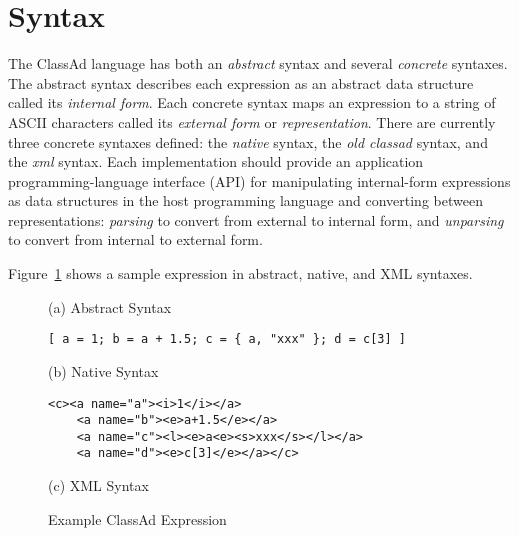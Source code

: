 \documentclass{article}
\begin{document}
\section{Syntax}

The ClassAd language has both an \emph{abstract} syntax and several
\emph{concrete} syntaxes.  The abstract syntax describes each expression as an
abstract data structure called its \emph{internal form}.
Each concrete syntax maps an
expression to a string of ASCII characters called its \emph{external form} or
\emph{representation}.  There are currently three concrete syntaxes defined:
the \emph{native} syntax, the \emph{old classad} syntax, and the \emph{xml}
syntax.  Each implementation should provide an application programming-language
interface (API) for manipulating internal-form expressions as data structures
in the host programming language and converting between representations:
\emph{parsing} to convert from external to internal form, and \emph{unparsing}
to convert from internal to external form.

Figure~\ref{fig:example1} shows a sample expression in abstract, native, and
XML syntaxes.

\begin{figure}[hbt!]
\begin{center}

\vspace{\baselineskip}
(a) Abstract Syntax

\vspace{\baselineskip}
\verb/[ a = 1; b = a + 1.5; c = { a, "xxx" }; d = c[3] ]/

\vspace{\baselineskip}
(b) Native Syntax

\vspace{\baselineskip}
\begin{minipage}{3.5in}
\begin{verbatim}
<c><a name="a"><i>1</i></a>
    <a name="b"><e>a+1.5</e></a>
    <a name="c"><l><e>a<e><s>xxx</s></l></a>
    <a name="d"><e>c[3]</e></a></c>
\end{verbatim}
\end{minipage}

\vspace{\baselineskip}
(c) XML Syntax

\end{center}
\caption{Example ClassAd Expression}
\label{fig:example1}
\end{figure}
\end{document}
